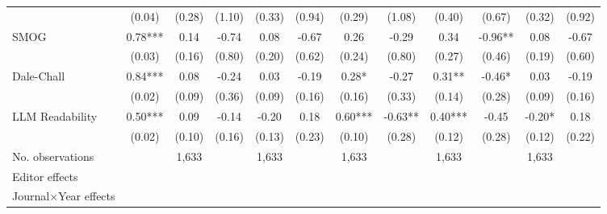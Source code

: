 \begin{table}
\begin{threeparttable}
\begin{tabular}{p{3cm}S@{}S@{}S@{}S@{}S@{}S@{}S@{}S@{}S@{}S@{}S@{}}
                                          &      (0.04)   &      (0.28)   &      (1.10)   &      (0.33)   &      (0.94)   &      (0.29)   &      (1.08)   &      (0.40)   &      (0.67)   &      (0.32)   &      (0.92)   \\
            SMOG                          &        0.78***&        0.14   &       -0.74   &        0.08   &       -0.67   &        0.26   &       -0.29   &        0.34   &       -0.96** &        0.08   &       -0.67   \\
                                          &      (0.03)   &      (0.16)   &      (0.80)   &      (0.20)   &      (0.62)   &      (0.24)   &      (0.80)   &      (0.27)   &      (0.46)   &      (0.19)   &      (0.60)   \\
            Dale-Chall                    &        0.84***&        0.08   &       -0.24   &        0.03   &       -0.19   &        0.28*  &       -0.27   &        0.31** &       -0.46*  &        0.03   &       -0.19   \\
                                          &      (0.02)   &      (0.09)   &      (0.36)   &      (0.09)   &      (0.16)   &      (0.16)   &      (0.33)   &      (0.14)   &      (0.28)   &      (0.09)   &      (0.16)   \\
            LLM Readability               &        0.50***&        0.09   &       -0.14   &       -0.20   &        0.18   &        0.60***&       -0.63** &        0.40***&       -0.45   &       -0.20*  &        0.18   \\
                                          &      (0.02)   &      (0.10)   &      (0.16)   &      (0.13)   &      (0.23)   &      (0.10)   &      (0.28)   &      (0.12)   &      (0.28)   &      (0.12)   &      (0.22)   \\
            \midrule
            No. observations              &               &       1,633   &               &       1,633   &               &       1,633   &               &       1,633   &               &       1,633   &               \\
            \midrule
            Editor effects       &               &           {}   &               &           {}   &               &           {}   &               &           {}   &               &               &               \\
            Journal\(\times\)Year effects          &               &           {}   &               &           {}   &               &           {}   &               &           {}   &               &               &               \\

\end{tabular}
\end{threeparttable}
\end{table}
